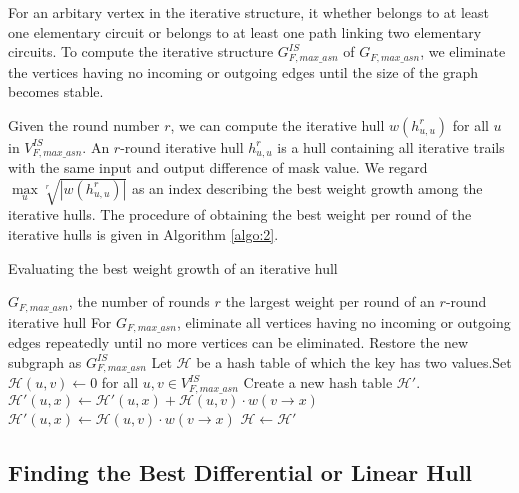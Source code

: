For an arbitary vertex in the iterative structure, it whether belongs to at least one elementary circuit or belongs to at least one path linking two elementary circuits. To compute the iterative structure $G^{IS}_{F,max\_asn}$ of $G_{F,max\_asn}$, we eliminate the vertices having no incoming or outgoing edges until the size of the graph becomes stable. 

Given the round number $r$, we can compute the iterative hull $w(h_{u,u}^r)$ for all $u$ in $V^{IS}_{F,max\_asn}$. An $r$-round iterative hull $h_{u,u}^r$ is a hull containing all iterative trails with the same input and output difference of mask value. We regard $\max\limits_{u}\sqrt[r]{|w(h_{u,u}^r)|}$ as an index describing the best weight growth among the iterative hulls. The procedure of obtaining the best weight per round of the iterative hulls is given in Algorithm \ref{algo:2}.


\begin{algorithm}
	\caption{Evaluating the best weight growth of an iterative hull}
	\label{algo:2}
	\begin{algorithmic}[1]
		\Require $G_{F,max\_asn}$, the number of rounds $r$
		\Ensure the largest weight per round of an $r$-round iterative hull
		\Procedure {}{}
		\State For $G_{F,max\_asn}$, eliminate all vertices having no incoming or outgoing edges repeatedly until no more vertices can be eliminated. Restore the new subgraph as $G^{IS}_{F,max\_asn}$
		\State Let $\mathcal{H}$ be a hash table of which the key has two values.Set $\mathcal{H}(u,v)\leftarrow 0$ for all $u,v\in V^{IS}_{F,max\_asn}$
		\State Create a new hash table $\mathcal{H}'$. 
		\State $\mathcal{H}'(u,x)\leftarrow \mathcal{H}'(u,x)+\mathcal{H}(u,v)\cdot w(v\rightarrow x)$
		\Else 
		\State $\mathcal{H}'(u,x)\leftarrow \mathcal{H}(u,v)\cdot w(v\rightarrow x)$
		\EndIf
		\EndFor
		\EndFor
		\State $\mathcal{H}\leftarrow \mathcal{H}'$
		\EndFor
		\State {}
		\EndProcedure
	\end{algorithmic}
\end{algorithm}

\subsection{Finding the Best Differential or Linear Hull}\label{sec:fbh}

